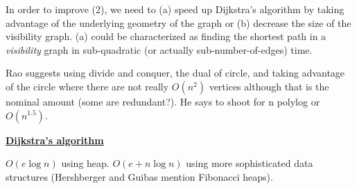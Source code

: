 In order to improve (2), we need to (a) speed up Dijkstra's algorithm
by taking advantage of the underlying geometry of the graph
or (b) decrease the size of the visibility graph.
(a) could be characterized as finding the shortest path in a {\em visibility}
graph in sub-quadratic (or actually sub-number-of-edges) time.

Rao suggests using divide and conquer, the dual of circle, and taking
advantage of the circle where there are not really $O(n^{2})$ vertices
although that is the nominal amount (some are redundant?).
He says to shoot for n polylog or $O(n^{1.5})$.



\underline{\bf Dijkstra's algorithm}

$O(e \log n)$ using heap.
$O(e + n \log n)$ using more sophisticated data structures
	(Hershberger and Guibas mention Fibonacci heaps).



